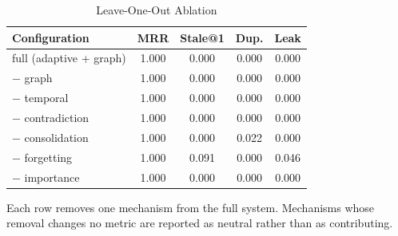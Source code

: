\begin{table}[t]
\caption{Leave-One-Out Ablation}
\label{tab:loo}
\centering
\footnotesize
\setlength{\tabcolsep}{4pt}
\begin{tabular}{@{}lcccc@{}}
\toprule
\textbf{Configuration} & \textbf{MRR} & \textbf{Stale@1} & \textbf{Dup.} & \textbf{Leak} \\
\midrule
full (adaptive + graph) & 1.000 & 0.000 & 0.000 & 0.000 \\
− graph & 1.000 & 0.000 & 0.000 & 0.000 \\
− temporal & 1.000 & 0.000 & 0.000 & 0.000 \\
− contradiction & 1.000 & 0.000 & 0.000 & 0.000 \\
− consolidation & 1.000 & 0.000 & 0.022 & 0.000 \\
− forgetting & 1.000 & 0.091 & 0.000 & 0.046 \\
− importance & 1.000 & 0.000 & 0.000 & 0.000 \\
\bottomrule
\end{tabular}
\par\vspace{2pt}
\raggedright\scriptsize Each row removes one mechanism from the full system. Mechanisms whose removal changes no metric are reported as neutral rather than as contributing.
\end{table}
